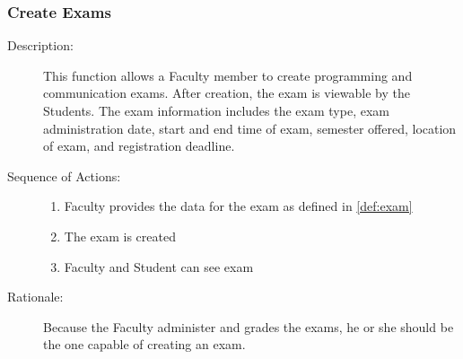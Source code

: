    \subsubsection{\large Create Exams} 
   \begin{boxed} %
      \begin{description}
         \item[Description:\label{desc:Create Exams}]
      This function allows a Faculty member to create programming and
      communication exams. After creation, the exam is viewable by the Students.
      The exam information includes the exam type, exam administration date,
      start and end time of exam, semester offered, location of exam, and
      registration deadline.
      
         \item[Sequence of Actions:]\hspace{10cm}
      \begin{enumerate}
         \item Faculty provides the data for the exam as defined in
            \autoref{def:exam}
         \item The exam is created
         \item Faculty and Student can see exam
      \end{enumerate}

         \item[Rationale:]
      Because the Faculty administer and grades the exams, he or she should
      be the one capable of creating an exam.
      \end{description}
   \end{boxed} %

